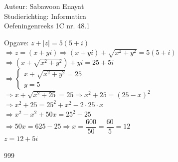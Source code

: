 \documentclass[a4paper]{article}
\begin{document}
  
\noindent \large Auteur: Sabawoon Enayat \\
\noindent \large Studierichting: Informatica\\
\noindent \large Oefeningenreeks 1C nr. 48.1\\

\medskip

\normalsize

Opgave: $z + |z| = 5(5 + i)$\\

$\Rightarrow z = (x + yi) \Rightarrow (x + yi) + \sqrt{x^2 + y^2} = 5(5 + i)$\\

$\Rightarrow \left(x + \sqrt{x^2 + y^2}\right) + yi = 25 + 5i$\\

$\Rightarrow \left \{
	\begin{array}{l}
		x + \sqrt{x^2 + y^2} = 25 \\
		y = 5
	\end{array}
\right.$\\

$\Rightarrow x + \sqrt{x^2 + 25} = 25 \Rightarrow x^2 + 25 = (25 - x)^2$\\

$\Rightarrow x^2 + 25 = 25^2 + x^2 - 2 \cdot 25 \cdot x$\\

$\Rightarrow x^2 - x^2 + 50x = 25^2 - 25$\\

$\Rightarrow 50x = 625 - 25 \Rightarrow x = \dfrac{600}{50} = \dfrac{60}{5} = 12$\\

$z = 12 + 5i$\\

\begin{thebibliography}{999}
\end{thebibliography}
\end{document}
